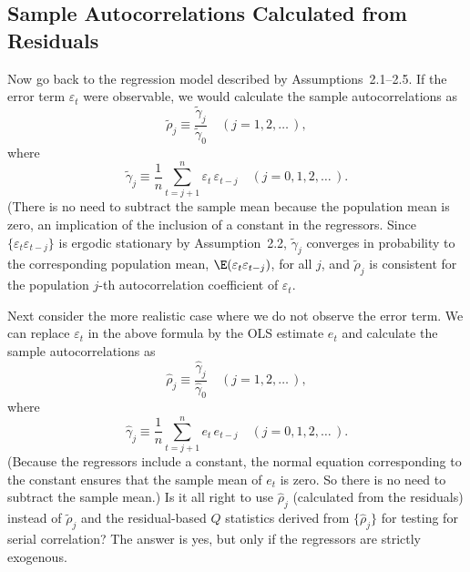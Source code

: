 \subsection*{Sample Autocorrelations Calculated from Residuals}

Now go back to the regression model described by Assumptions~2.1--2.5. If the
error term $\varepsilon_t$ were observable, we would calculate the sample autocorrelations as
%
\begin{equation}
\tilde{\rho}_j \equiv \frac{\tilde{\gamma}_j}{\tilde{\gamma}_0}
\quad (j = 1, 2, \ldots\,),
\label{eq:2.10.6}
\end{equation}
%
where
%
\begin{equation}
\tilde{\gamma}_j \equiv \frac{1}{n}\sum_{t=j+1}^{n}\varepsilon_t\,\varepsilon_{t-j}
\quad (j = 0, 1, 2, \ldots\,).
\label{eq:2.10.7}
\end{equation}
%
(There is no need to subtract the sample mean because the population mean is
zero, an implication of the inclusion of a constant in the regressors. Since
$\{\varepsilon_t\varepsilon_{t-j}\}$ is ergodic stationary by Assumption~2.2, $\tilde{\gamma}_j$ converges in probability
to the corresponding population mean, $\E(\varepsilon_t\varepsilon_{t-j})$, for all $j$, and $\tilde{\rho}_j$ is consistent
for the population $j$-th autocorrelation coefficient of $\varepsilon_t$.

Next consider the more realistic case where we do not observe the error term.
We can replace $\varepsilon_t$ in the above formula by the OLS estimate $e_t$ and calculate the
sample autocorrelations as
%
\begin{equation}
\hat{\rho}_j \equiv \frac{\hat{\gamma}_j}{\hat{\gamma}_0}
\quad (j = 1, 2, \ldots\,),
\label{eq:2.10.8}
\end{equation}
%
where
%
\begin{equation}
\hat{\gamma}_j \equiv \frac{1}{n}\sum_{t=j+1}^{n} e_t\,e_{t-j}
\quad (j = 0, 1, 2, \ldots\,).
\label{eq:2.10.9}
\end{equation}
%
(Because the regressors include a constant, the normal equation corresponding to
the constant ensures that the sample mean of $e_t$ is zero. So there is no need to
subtract the sample mean.) Is it all right to use $\hat{\rho}_j$ (calculated from the residuals) instead of $\tilde{\rho}_j$ and the residual-based $Q$ statistics derived from $\{\hat{\rho}_j\}$ for testing
for serial correlation? The answer is yes, but only if the regressors are strictly
exogenous.

